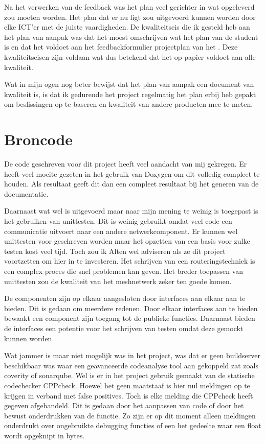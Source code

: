 \documentclass[a4paper, 11pt, oneside]{report}
\begin{document}
Na het verwerken van de feedback was het plan veel gerichter in wat opgeleverd zou moeten worden.
Het plan dat er nu ligt zou uitgevoerd kunnen worden door elke ICT'er met de juiste vaardigheden.
De kwaliteitseis die ik gesteld heb aan het plan van aanpak was dat het moest omschrijven wat het plan van de student is en dat het voldoet aan het feedbackformulier projectplan van het \citeauthor{HANfeed} \citeyear{HANfeed}. Deze kwaliteitseisen zijn voldaan wat dus betekend dat het op papier voldoet aan alle kwaliteit.

Wat in mijn ogen nog beter bewijst dat het plan van aanpak een document van kwaliteit is, is dat ik gedurende het project regelmatig het plan erbij heb gepakt om beslissingen op te baseren en kwaliteit van andere producten mee te meten.

\section{Broncode}\label{sec:broncode}
De code geschreven voor dit project heeft veel aandacht van mij gekregen. 
Er heeft veel moeite gezeten in het gebruik van Doxygen om dit volledig compleet te houden.
Als resultaat geeft dit dan een compleet resultaat bij het generen van de documentatie. 

Daarnaast wat wel is uitgevoerd maar naar mijn mening te weinig is toegepast is het gebruiken van unittesten.
Dit is weinig gebruikt omdat veel code een communicatie uitvoert naar een andere netwerkcomponent.
Er kunnen wel unittesten voor geschreven worden maar het opzetten van een basis voor zulke testen kost veel tijd.
Toch zou ik Alten wel adviseren als ze dit project voortzetten om hier in te investeren.
Het schrijven van een routeringstechniek is een complex proces die snel problemen kan geven.
Het breder toepassen van unittesten zou de kwaliteit van het meshnetwerk zeker ten goede komen. 

De componenten zijn op elkaar aangesloten door interfaces aan elkaar aan te bieden.
Dit is gedaan om meerdere redenen. 
Door elkaar interfaces aan te bieden bewaakt een component zijn toegang tot de publieke functies.
Daarnaast bieden de interfaces een potentie voor het schrijven van testen omdat deze gemockt kunnen worden.  

Wat jammer is maar niet mogelijk was in het project, was dat er geen buildserver beschikbaar was waar een geavanceerde codeanalyse tool aan gekoppeld zat zoals coverity of sonarqube. Wel is er in het project gebruik gemaakt van de statische codechecker CPPcheck. Hoewel het geen maatstaaf is hier nul meldingen op te krijgen in verband met false positives. 
Toch is elke melding die CPPcheck heeft gegeven afgehandeld. Dit is gedaan door het aanpassen van code of door het bewust onderdrukken van de functie. Zo zijn er op dit moment alleen meldingen onderdrukt over ongebruikte debugging functies of een het gedeelte waar een float wordt opgeknipt in bytes.
  
\end{document}
